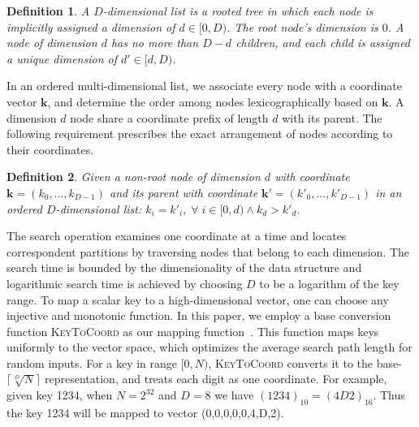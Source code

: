\documentclass[10pt,conference,compsocconf]{IEEEtran}
\newtheorem{definition}{Definition}
\begin{document}
\begin{definition}
\label{def:mdlist}
A $D$-dimensional list is a rooted tree in which each node is implicitly assigned a dimension of $d \in [0,D)$. The root node's dimension is $0$. A node of dimension $d$ has no more than $D-d$ children, and each child is assigned a unique dimension of $d' \in [d,D)$.
\end{definition}
\vspace{-0.05in}

In an ordered multi-dimensional list, we associate every node with a coordinate vector $\mathbf{k}$, and determine the order among nodes lexicographically based on $\mathbf{k}$.
A dimension $d$ node share a coordinate prefix of length $d$ with its parent.
The following requirement prescribes the exact arrangement of nodes according to their coordinates.
\vspace{-0.05in}
\theoremstyle{definition}
\begin{definition}
\label{def:mdlistsort}
    Given a non-root node of dimension $d$ with coordinate $\mathbf{k}=(k_0,...,k_{D-1})$ and its parent with coordinate $\mathbf{k'}=(k'_0,...,k'_{D-1})$ in an ordered $D$-dimensional list: $k_i = k'_i, \;\forall \;i \in [0, d) \land k_d > k'_d$.
\end{definition}
\vspace{-0.05in}

The search operation examines one coordinate at a time and locates correspondent partitions by traversing nodes that belong to each dimension. 
The search time is bounded by the dimensionality of the data structure and logarithmic search time is achieved by choosing $D$ to be a logarithm of the key range. 
To map a scalar key to a high-dimensional vector, one can choose any injective and monotonic function.
In this paper, we employ a base conversion function \textsc{KeyToCoord} as our mapping function~\cite{zhang2015lockfree}.
This function maps keys uniformly to the vector space, which optimizes the average search path length for random inputs.
For a key in range $[0,N)$, \textsc{KeyToCoord} converts it to the base-$\lceil \sqrt[D]{N}\rceil$ representation, and treats each digit as one coordinate.
For example, given key 1234, when $N=2^{32}$ and $D=8$ we have $(1234)_{10}=(4D2)_{16}$.
Thus the key 1234 will be mapped to vector (0,0,0,0,0,4,D,2).
\end{document}
